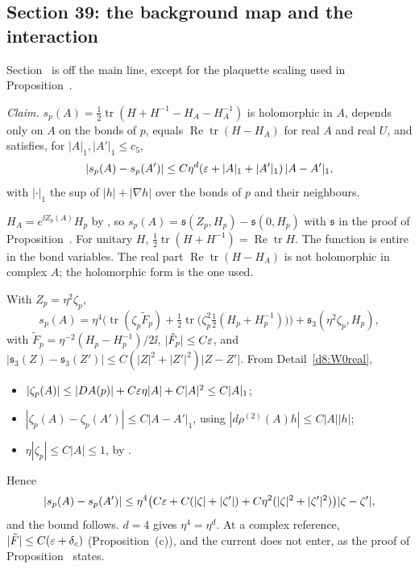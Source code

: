 \subsection{Section 39: the background map and the interaction}\label{d8:s39}

Section~ is off the main line, except for the plaquette scaling used in Proposition~.

\begin{detail}\label{d8:plaquette}
\emph{Claim.} $s_p(A)=\frac12\operatorname{tr}(H+H^{-1}-H_A-H_A^{-1})$ is holomorphic in $A$, depends only on $A$ on the bonds of $p$, equals $\operatorname{Re}\operatorname{tr}(H-H_A)$ for real $A$ and real $U$, and satisfies, for $|A|_1,|A'|_1\le c_5$,
\[
|s_p(A)-s_p(A')|\le C\eta^d(\varepsilon+|A|_1+|A'|_1)\,|A-A'|_1 ,
\]
with $|\cdot|_1$ the sup of $|h|+|\nabla h|$ over the bonds of $p$ and their neighbours.
\begin{step}
$H_A=e^{\ii Z_p(A)}H_p$ by , so $s_p(A)=\mathfrak s(Z_p,H_p)-\mathfrak s(0,H_p)$ with $\mathfrak s$ in the proof of Proposition~. For unitary $H$, $\frac12\operatorname{tr}(H+H^{-1})=\operatorname{Re}\operatorname{tr}H$. The function is entire in the bond variables. The real part $\operatorname{Re}\operatorname{tr}(H-H_A)$ is not holomorphic in complex $A$; the holomorphic form is the one used.
\end{step}
\begin{step}
With $Z_p=\eta^2\zeta_p$,
\[
s_p(A)=\eta^4\Big(\operatorname{tr}(\zeta_p\tilde F_p)+\tfrac12\operatorname{tr}\big(\zeta_p^2\tfrac12(H_p+H_p^{-1})\big)\Big)+\mathfrak s_3(\eta^2\zeta_p,H_p),
\]
with $\tilde F_p=\eta^{-2}(H_p-H_p^{-1})/2\ii$, $|\tilde F_p|\le C\varepsilon$, and $|\mathfrak s_3(Z)-\mathfrak s_3(Z')|\le C(|Z|^2+|Z'|^2)|Z-Z'|$. From Detail~\ref{d8:W0real},
\begin{itemize}
\item $|\zeta_p(A)|\le|DA(p)|+C\varepsilon\eta|A|+C|A|^2\le C|A|_1$;
\item $|\zeta_p(A)-\zeta_p(A')|\le C|A-A'|_1$, using $|d\rho^{(2)}(A)h|\le C|A||h|$;
\item $\eta|\zeta_p|\le C|A|\le1$, by .
\end{itemize}
Hence
\[
|s_p(A)-s_p(A')|\le\eta^4\big(C\varepsilon+C(|\zeta|+|\zeta'|)+C\eta^2(|\zeta|^2+|\zeta'|^2)\big)|\zeta-\zeta'|,
\]
and the bound follows. $d=4$ gives $\eta^4=\eta^d$. At a complex reference, $|\tilde F|\le C(\varepsilon+\delta_c)$ (Proposition~(c)), and the current does not enter, as the proof of Proposition~ states.
\end{step}
\end{detail}

